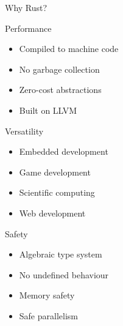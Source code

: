 \documentclass[8pt, aspectratio=169]{beamer}
\begin{document}
\begin{frame}{Why Rust?}
\begin{block}{Performance}
\begin{multicols}{2}
\begin{itemize}
\item Compiled to machine code
\item No garbage collection
\end{itemize}
\columnbreak
\begin{itemize}
\item Zero-cost abstractions
\item Built on LLVM
\end{itemize}
\end{multicols}
\end{block}
\begin{block}{Versatility}
\begin{multicols}{2}
\begin{itemize}
\item Embedded development
\item Game development
\end{itemize}
\columnbreak
\begin{itemize}
\item Scientific computing
\item Web development
\end{itemize}
\end{multicols}
\end{block}
\begin{block}{Safety}
\begin{multicols}{2}
\begin{itemize}
\item Algebraic type system
\item No undefined behaviour
\end{itemize}
\columnbreak
\begin{itemize}
\item Memory safety
\item Safe parallelism
\end{itemize}
\end{multicols}
\end{block}
\end{frame}
\end{document}
